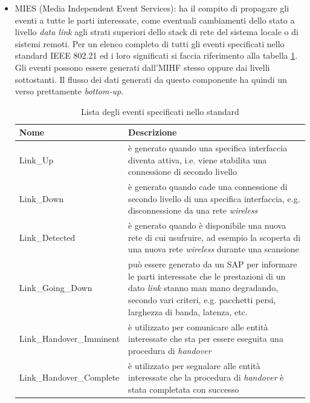 \begin{itemize}
\item MIES (Media Independent Event Services): ha il compito di propagare gli eventi a tutte le parti interessate, come eventuali cambiamenti dello stato a livello {\em data link} agli strati superiori dello stack di rete del sistema locale o di sistemi remoti. Per un elenco completo di tutti gli eventi specificati nello standard IEEE 802.21 ed i loro significati si faccia riferimento alla tabella \ref{mihevents}. Gli eventi possono essere generati dall'MIHF stesso oppure dai livelli sottostanti. Il flusso dei dati generati da questo componente ha quindi un verso prettamente {\em bottom-up}.

\begin{table}[h]
\begin{tabular}{p{}|p{}}
\toprule
\textbf{Nome} & \textbf{Descrizione} \\
\midrule
Link\_Up & è generato quando una specifica interfaccia diventa attiva, i.e. viene stabilita una connessione di secondo livello\\
\hline
Link\_Down & è generato quando cade una connessione di secondo livello di una specifica interfaccia, e.g. disconnessione da una rete {\em wireless}\\
\hline
Link\_Detected & è generato quando è disponibile una nuova rete di cui usufruire, ad esempio la scoperta di una nuova rete {\em wireless} durante una scansione\\
\hline
Link\_Going\_Down & può essere generato da un SAP per informare le parti interessate che le prestazioni di un dato {\em link} stanno man mano degradando, secondo vari criteri, e.g. pacchetti persi, larghezza di banda, latenza, etc.\\
\hline
Link\_Handover\_Imminent & è utilizzato per comunicare alle entità interessate che sta per essere eseguita una procedura di {\em handover} \\
\hline
Link\_Handover\_Complete & è utilizzato per segnalare alle entità interessate che la procedura di {\em handover} è stata completata con successo\\
\bottomrule
\end{tabular}
\caption{Lista degli eventi specificati nello standard}
\label{mihevents}
\end{table}


\end{itemize}
